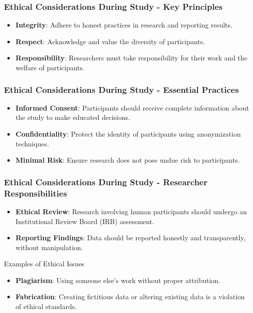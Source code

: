 \documentclass[aspectratio=169]{beamer}
\begin{document}
\begin{frame}[fragile]
    \frametitle{Ethical Considerations During Study - Key Principles}
    \begin{itemize}
        \item \textbf{Integrity}: Adhere to honest practices in research and reporting results.
        \item \textbf{Respect}: Acknowledge and value the diversity of participants.
        \item \textbf{Responsibility}: Researchers must take responsibility for their work and the welfare of participants.
    \end{itemize}
\end{frame}

\begin{frame}[fragile]
    \frametitle{Ethical Considerations During Study - Essential Practices}
    \begin{itemize}
        \item \textbf{Informed Consent}: Participants should receive complete information about the study to make educated decisions.
        \item \textbf{Confidentiality}: Protect the identity of participants using anonymization techniques.
        \item \textbf{Minimal Risk}: Ensure research does not pose undue risk to participants.
    \end{itemize}
\end{frame}

\begin{frame}[fragile]
    \frametitle{Ethical Considerations During Study - Researcher Responsibilities}
    \begin{itemize}
        \item \textbf{Ethical Review}: Research involving human participants should undergo an Institutional Review Board (IRB) assessment.
        \item \textbf{Reporting Findings}: Data should be reported honestly and transparently, without manipulation.
    \end{itemize}
    \begin{block}{Examples of Ethical Issues}
        \begin{itemize}
            \item \textbf{Plagiarism}: Using someone else's work without proper attribution.
            \item \textbf{Fabrication}: Creating fictitious data or altering existing data is a violation of ethical standards.
        \end{itemize}
    \end{block}
\end{frame}
\end{document}
